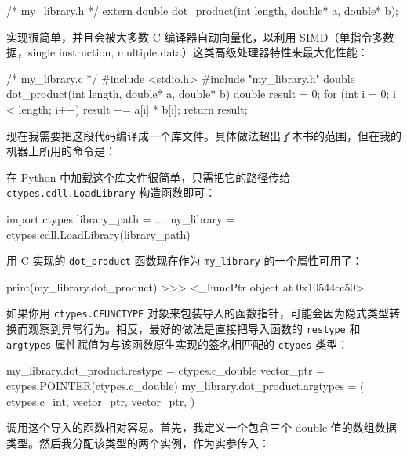 \begin{codebox}[python]
/* my_library.h */
extern double dot_product(int length, double* a, double* b);
\end{codebox}

实现很简单，并且会被大多数 C 编译器自动向量化，以利用 SIMD（单指令多数据，single instruction, multiple data）这类高级处理器特性来最大化性能：

\begin{codebox}[python]
/* my_library.c */
#include <stdio.h>
#include "my_library.h"
double dot_product(int length, double* a, double* b) {
    double result = 0;
    for (int i = 0; i < length; i++) {
        result += a[i] * b[i];
    }
    return result;
}
\end{codebox}

现在我需要把这段代码编译成一个库文件。具体做法超出了本书的范围，但在我的机器上所用的命令是：


在 Python 中加载这个库文件很简单，只需把它的路径传给 \texttt{ctypes.cdll.LoadLibrary} 构造函数即可：

\begin{codebox}[python]
import ctypes
library_path = ...
my_library = ctypes.cdll.LoadLibrary(library_path)
\end{codebox}

用 C 实现的 \texttt{dot\_product} 函数现在作为 \texttt{my\_library} 的一个属性可用了：

\begin{codebox}[python]
print(my_library.dot_product)
>>>
<_FuncPtr object at 0x10544cc50>
\end{codebox}

如果你用 \texttt{ctypes.CFUNCTYPE} 对象来包装导入的函数指针，可能会因为隐式类型转换而观察到异常行为。相反，最好的做法是直接把导入函数的 \texttt{restype} 和 \texttt{argtypes} 属性赋值为与该函数原生实现的签名相匹配的 \texttt{ctypes} 类型：

\begin{codebox}[python]
my_library.dot_product.restype = ctypes.c_double
vector_ptr = ctypes.POINTER(ctypes.c_double)
my_library.dot_product.argtypes = (
    ctypes.c_int,
    vector_ptr,
    vector_ptr,
)
\end{codebox}

调用这个导入的函数相对容易。首先，我定义一个包含三个 double 值的数组数据类型。然后我分配该类型的两个实例，作为实参传入：


